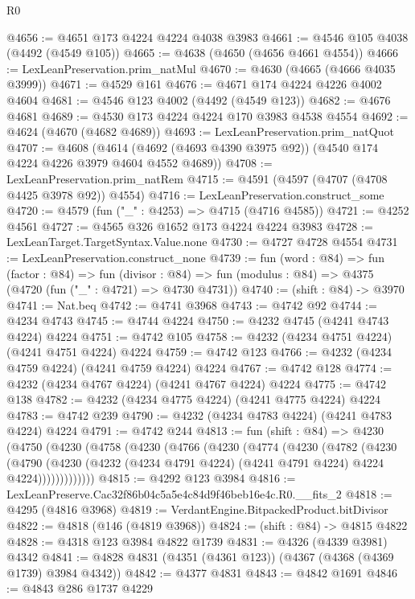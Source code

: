 \begin{lexlean}{R0}
\begin{coremodule}
@4656 := @4651 @173 @4224 @4224 @4038 @3983
@4661 := @4546 @105 @4038 (@4492 (@4549 @105))
@4665 := @4638 (@4650 (@4656 @4661 @4554))
@4666 := LexLeanPreservation.prim_natMul
@4670 := @4630 (@4665 (@4666 @4035 @3999))
@4671 := @4529 @161
@4676 := @4671 @174 @4224 @4226 @4002 @4604
@4681 := @4546 @123 @4002 (@4492 (@4549 @123))
@4682 := @4676 @4681
@4689 := @4530 @173 @4224 @4224 @170 @3983 @4538 @4554
@4692 := @4624 (@4670 (@4682 @4689))
@4693 := LexLeanPreservation.prim_natQuot
@4707 := @4608
    (@4614 (@4692 (@4693 @4390 @3975 @92)) (@4540 @174 @4224 @4226 @3979 @4604 @4552 @4689))
@4708 := LexLeanPreservation.prim_natRem
@4715 := @4591 (@4597 (@4707 (@4708 @4425 @3978 @92)) @4554)
@4716 := LexLeanPreservation.construct_some
@4720 := @4579 (fun ("_" : @4253) => @4715 (@4716 @4585))
@4721 := @4252 @4561
@4727 := @4565 @326 @1652 @173 @4224 @4224 @3983
@4728 := LexLeanTarget.TargetSyntax.Value.none
@4730 := @4727 @4728 @4554
@4731 := LexLeanPreservation.construct_none
@4739 := fun (word : @84) =>
  fun (factor : @84) =>
  fun (divisor : @84) => fun (modulus : @84) => @4375 (@4720 (fun ("_" : @4721) => @4730 @4731))
@4740 := (shift : @84) -> @3970
@4741 := Nat.beq
@4742 := @4741 @3968
@4743 := @4742 @92
@4744 := @4234 @4743
@4745 := @4744 @4224
@4750 := @4232 @4745 (@4241 @4743 @4224) @4224
@4751 := @4742 @105
@4758 := @4232 (@4234 @4751 @4224) (@4241 @4751 @4224) @4224
@4759 := @4742 @123
@4766 := @4232 (@4234 @4759 @4224) (@4241 @4759 @4224) @4224
@4767 := @4742 @128
@4774 := @4232 (@4234 @4767 @4224) (@4241 @4767 @4224) @4224
@4775 := @4742 @138
@4782 := @4232 (@4234 @4775 @4224) (@4241 @4775 @4224) @4224
@4783 := @4742 @239
@4790 := @4232 (@4234 @4783 @4224) (@4241 @4783 @4224) @4224
@4791 := @4742 @244
@4813 := fun (shift : @84) =>
  @4230
    (@4750
      (@4230
        (@4758
          (@4230
            (@4766
              (@4230
                (@4774
                  (@4230
                    (@4782
                      (@4230
                        (@4790
                          (@4230
                            (@4232 (@4234 @4791 @4224) (@4241 @4791 @4224) @4224 @4224)))))))))))))
@4815 := @4292 @123 @3984
@4816 := LexLeanPreserve.Cac32f86b04c5a5e4c84d9f46beb16e4c.R0.__fits_2
@4818 := @4295 (@4816 @3968)
@4819 := VerdantEngine.BitpackedProduct.bitDivisor
@4822 := @4818 (@146 (@4819 @3968))
@4824 := (shift : @84) -> @4815 @4822
@4828 := @4318 @123 @3984 @4822 @1739
@4831 := @4326 (@4339 @3981) @4342
@4841 := @4828 @4831 (@4351 (@4361 @123)) (@4367 (@4368 (@4369 @1739) @3984 @4342))
@4842 := @4377 @4831
@4843 := @4842 @1691
@4846 := @4843 @286 @1737 @4229

\end{coremodule}
\end{lexlean}
